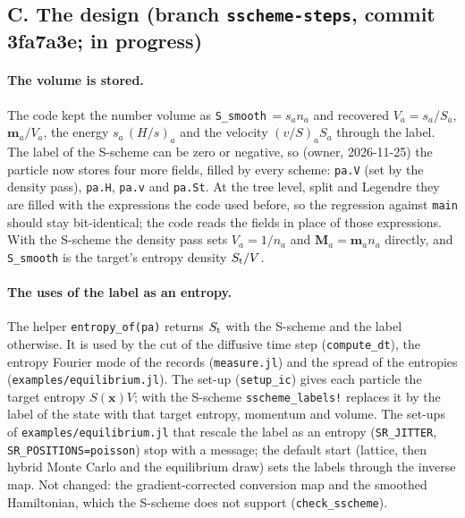 \documentclass[11pt,aps,preprint,nofootinbib,superscriptaddress,tightenlines]{revtex4-2}
\let\oldparagraph\paragraph
\renewcommand{\paragraph}{\par\bigskip\oldparagraph}
\begin{document}
\subsection*{C. The design (branch \texttt{sscheme-steps}, commit 3fa7a3e; in progress)}

\paragraph{The volume is stored.}  The code kept the number volume as \texttt{S\_smooth}$\,=s_an_a$ and recovered $V_a=s_a/S_a$, $\bm m_a/V_a$, the
energy $s_a\,(H/s)_a$ and the velocity $(v/S)_aS_a$ through the label.  The label of the S-scheme can be zero or negative, so (owner, 2026-11-25) the
particle now stores four more fields, filled by every scheme: \texttt{pa.V} (set by the density pass), \texttt{pa.H}, \texttt{pa.v} and \texttt{pa.St}.  At the
tree level, split and Legendre they are filled with the expressions the code used before, so the regression against \texttt{main} should stay
bit-identical; the code reads the fields in place of those expressions.  With the S-scheme the density pass sets $V_a=1/n_a$ and
$\bm M_a=\bm m_an_a$ directly, and \texttt{S\_smooth} is the target's entropy density $S_{\rm t}/V$.

\paragraph{The uses of the label as an entropy.}  The helper \texttt{entropy\_of(pa)} returns $S_{\rm t}$ with the S-scheme and the label otherwise.
It is used by the cut of the diffusive time step (\texttt{compute\_dt}), the entropy Fourier mode of the records (\nolinkurl{measure.jl}) and the
spread of the entropies (\nolinkurl{examples/equilibrium.jl}).  The set-up (\texttt{setup\_ic}) gives each particle the target entropy $S(\bm x)V$; with
the S-scheme \texttt{sscheme\_labels!} replaces it by the label of the state with that target entropy, momentum and volume.  The set-ups of
\nolinkurl{examples/equilibrium.jl} that rescale the label as an entropy (\texttt{SR\_JITTER}, \texttt{SR\_POSITIONS=poisson}) stop with a message;
the default start (lattice, then hybrid Monte Carlo and the equilibrium draw) sets the labels through the inverse map.  Not changed: the
gradient-corrected conversion map and the smoothed Hamiltonian, which the S-scheme does not support (\texttt{check\_sscheme}).
\end{document}
